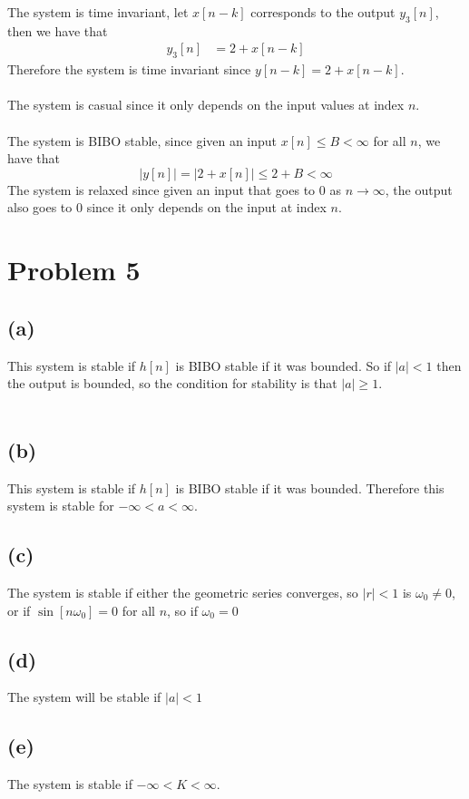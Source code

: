 The system is time invariant, let $x[n-k]$ corresponds to the output $y_3[n]$, then we have that
\begin{align*}
    y_3[n]&=2+x[n-k]
\end{align*}
Therefore the system is time invariant since $y[n-k]=2+x[n-k]$.\\\\
The system is casual since it only depends on the input values at index $n$.\\\\
The system is BIBO stable, since given an input $x[n]\leq B<\infty$ for all $n$, we have that
$$|y[n]|=|2+x[n]|\leq 2+B < \infty$$
The system is relaxed since given an input that goes to $0$ as $n\to\infty$, the output
also goes to $0$ since it only depends on the input at index $n$.
\section*{Problem 5}
\subsection*{(a)}

This system is stable if $h[n]$ is BIBO stable if it was bounded.
So if $|a|<1$ then the output is bounded, so
the condition for stability is that $\boxed{|a|\geq1}$.\\\\
\subsection*{(b)}

This system is stable if $h[n]$ is BIBO stable if it was bounded. Therefore this system is stable for $\boxed{-\infty<a<\infty}$.
\subsection*{(c)}
The system is stable if either the geometric series converges, so $\boxed{|r|<1}$ is $\boxed{\omega_0\neq0}$, or 
if $\sin[n\omega_0]=0$ for all $n$, so if $\boxed{\omega_0=0}$
\subsection*{(d)}
The system will be stable if $\boxed{|a|<1}$
\subsection*{(e)}
The system is stable if $-\infty<K<\infty$.


